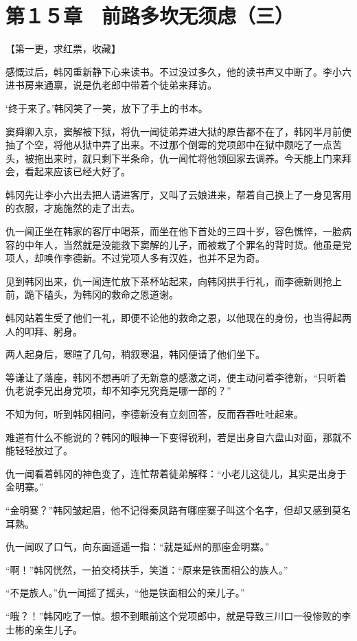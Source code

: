 \section{第１５章　前路多坎无须虑（三）}

【第一更，求红票，收藏】

感慨过后，韩冈重新静下心来读书。不过没过多久，他的读书声又中断了。李小六进书房来通禀，说是仇老郎中带着个徒弟来拜访。

‘终于来了。’韩冈笑了一笑，放下了手上的书本。

窦舜卿入京，窦解被下狱，将仇一闻徒弟弄进大狱的原告都不在了，韩冈半月前便抽了个空，将他从狱中弄了出来。不过那个倒霉的党项郎中在狱中颇吃了一点苦头，被拖出来时，就只剩下半条命，仇一闻忙将他领回家去调养。今天能上门来拜会，看起来应该已经大好了。

韩冈先让李小六出去把人请进客厅，又叫了云娘进来，帮着自己换上了一身见客用的衣服，才施施然的走了出去。

仇一闻正坐在韩家的客厅中喝茶，而坐在他下首处的三四十岁，容色憔悴，一脸病容的中年人，当然就是没能救下窦解的儿子，而被栽了个罪名的背时货。他虽是党项人，却唤作李德新。不过党项人多有汉姓，也并不足为奇。

见到韩冈出来，仇一闻连忙放下茶杯站起来，向韩冈拱手行礼，而李德新则抢上前，跪下磕头，为韩冈的救命之恩道谢。

韩冈站着生受了他们一礼，即便不论他的救命之恩，以他现在的身份，也当得起两人的叩拜、躬身。

两人起身后，寒暄了几句，稍叙寒温，韩冈便请了他们坐下。

等谦让了落座，韩冈不想再听了无新意的感激之词，便主动问着李德新，“只听着仇老说李兄出身党项，却不知李兄究竟是哪一部的？”

不知为何，听到韩冈相问，李德新没有立刻回答，反而吞吞吐吐起来。

难道有什么不能说的？韩冈的眼神一下变得锐利，若是出身自六盘山对面，那就不能轻轻放过了。

仇一闻看着韩冈的神色变了，连忙帮着徒弟解释：“小老儿这徒儿，其实是出身于金明寨。”

“金明寨？”韩冈皱起眉，他不记得秦凤路有哪座寨子叫这个名字，但却又感到莫名耳熟。

仇一闻叹了口气，向东面遥遥一指：“就是延州的那座金明寨。”

“啊！”韩冈恍然，一拍交椅扶手，笑道：“原来是铁面相公的族人。”

“不是族人。”仇一闻摇了摇头，“他是铁面相公的亲儿子。”

“哦？！”韩冈吃了一惊。想不到眼前这个党项郎中，就是导致三川口一役惨败的李士彬的亲生儿子。


